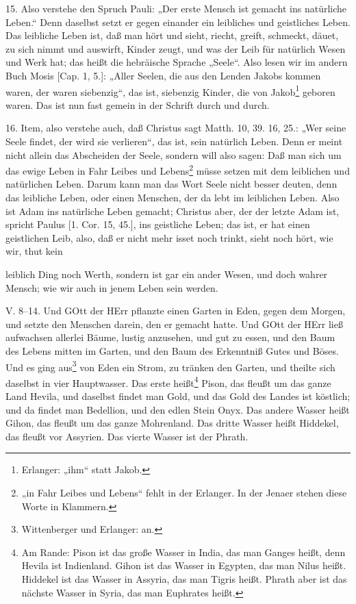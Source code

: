 15. Also verstehe den Spruch Pauli: „Der erste Mensch ist gemacht ins natürliche Leben.“ Denn daselbst setzt er gegen einander ein leibliches und geistliches Leben. Das leibliche Leben ist, daß man hört und sieht, riecht, greift, schmeckt, däuet, zu sich nimmt und auswirft, Kinder zeugt, und was der Leib für natürlich Wesen und Werk hat; das heißt die hebräische Sprache „Seele“. Also lesen wir im andern Buch Mosis [Cap. 1, 5.]: „Aller Seelen, die aus den Lenden Jakobs kommen waren, der waren siebenzig“, das ist, siebenzig Kinder, die von Jakob\footnote{Erlanger: „ihm“ statt Jakob.} geboren waren. Das ist nun fast gemein in der Schrift durch und durch.

16. Item, also verstehe auch, daß Christus sagt Matth. 10, 39. 16, 25.: „Wer seine Seele findet, der wird sie verlieren“, das ist, sein natürlich Leben. Denn er meint nicht allein das Abscheiden der Seele, sondern will also sagen: Daß man sich um das ewige Leben in Fahr Leibes und Lebens\footnote{„in Fahr Leibes und Lebens“ fehlt in der Erlanger. In der Jenaer stehen diese Worte in Klammern.} müsse setzen mit dem leiblichen und natürlichen Leben. Darum kann man das Wort Seele nicht besser deuten, denn das leibliche Leben, oder einen Menschen, der da lebt im leiblichen Leben. Also ist Adam ins natürliche Leben gemacht; Christus aber, der der letzte Adam ist, spricht Paulus [1. Cor. 15, 45.], ins geistliche Leben; das ist, er hat einen geistlichen Leib, also, daß er nicht mehr isset noch trinkt, sieht noch hört, wie wir, thut kein

leiblich Ding noch Werth, sondern ist gar ein ander Wesen, und doch wahrer Mensch; wie wir auch in jenem Leben sein werden.

\begin{schriftzitat}
V. 8–14. Und GOtt der HErr pflanzte einen Garten in Eden, gegen dem Morgen, und setzte den Menschen darein, den er gemacht hatte. Und GOtt der HErr ließ aufwachsen allerlei Bäume, lustig anzusehen, und gut zu essen, und den Baum des Lebens mitten im Garten, und den Baum des Erkenntniß Gutes und Böses. Und es ging aus\footnote{Wittenberger und Erlanger: an.} von Eden ein Strom, zu tränken den Garten, und theilte sich daselbst in vier Hauptwasser. Das erste heißt\footnote{Am Rande: Pison ist das große Wasser in India, das man Ganges heißt, denn Hevila ist Indienland. Gihon ist das Wasser in Egypten, das man Nilus heißt. Hiddekel ist das Wasser in Assyria, das man Tigris heißt. Phrath aber ist das nächste Wasser in Syria, das man Euphrates heißt.} Pison, das fleußt um das ganze Land Hevila, und daselbst findet man Gold, und das Gold des Landes ist köstlich; und da findet man Bedellion, und den edlen Stein Onyx. Das andere Wasser heißt Gihon, das fleußt um das ganze Mohrenland. Das dritte Wasser heißt Hiddekel, das fleußt vor Assyrien. Das vierte Wasser ist der Phrath.
\end{schriftzitat}

